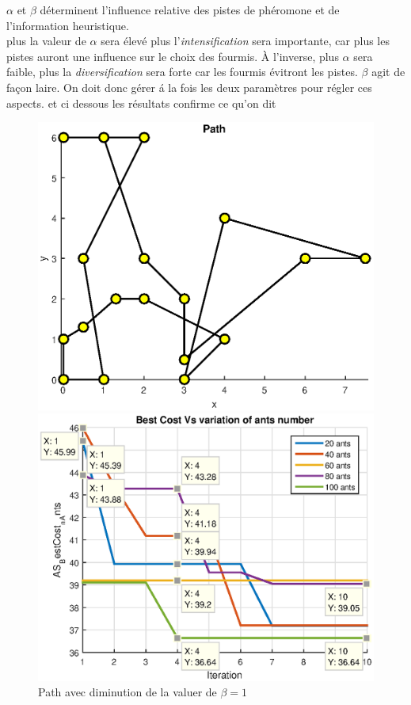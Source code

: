 $ \alpha $ et $ \beta $ d\'eterminent l'influence relative des pistes de ph\'eromone et de l'information heuristique.\\
plus la valeur de $ \alpha $ sera \'elev\'e plus l'\textit{intensification} sera importante, car plus les pistes auront une influence sur le choix des fourmis. \`A l'inverse, plus $ \alpha $ sera faible, plus la \textit{diversification} sera forte car les fourmis \'evitront les pistes.
	$ \beta $ agit de fa\c{c}on laire. On doit donc g\'erer \'a la fois les deux param\`etres pour r\'egler ces aspects. et ci dessous les r\'esultats confirme ce qu'on dit
\begin{figure}[H]
\begin{minipage}[t]{0.5\linewidth}
\centering
\includegraphics[width=\linewidth]{../figures/exp_alpha_0_beta_1/pathbigfig.eps}
\caption{Path avec diminution de la valuer de $ \beta=1 $}
\label{fig:exp_alpha_0_beta_1_pathbigfig}
\end{minipage}
\hspace{2mm}
\begin{minipage}[t]{0.5\linewidth}
\centering
\includegraphics[width=\textwidth]{../figures/exp_alpha_0_beta_1/AS_BestCost_n_Ants.eps}

\end{minipage}
\end{figure}
